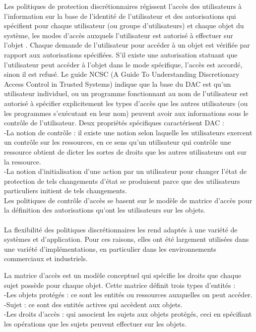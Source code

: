 \label{sectionDAC}

Les politiques de protection discrétionnaires régissent l'accès des utilisateurs à l'information sur la base de l'identité de l'utilisateur et des autorisations qui spécifient pour chaque utilisateur (ou groupe d'utilisateurs) et chaque objet du système, les modes d'accès auxquels l'utilisateur est autorisé à effectuer sur l'objet \cite{sandhu94}. Chaque demande de l'utilisateur pour accéder à un objet est vérifiée par rapport aux autorisations spécifiées. S'il existe une autorisation statuant que l'utilisateur peut accéder à l'objet dans le mode spécifique, l'accès est accordé, sinon il est refusé. Le guide NCSC (A Guide To Understanding Discretionary Access Control in Trusted Systems) indique que la base du DAC est qu'un utilisateur individuel, ou un programme fonctionnant au nom de l'utilisateur est autorisé à spécifier explicitement les types d'accès que les autres utilisateurs (ou les programmes s'exécutant en leur nom) peuvent avoir aux informations sous le contrôle de l'utilisateur. Deux propriétés spécifiques caractérisent DAC :\\ 
-La notion de contrôle : il existe une notion selon laquelle les utilisateurs exercent un contrôle sur les ressources, en ce sens qu'un utilisateur qui contrôle une ressource obtient de dicter les sortes de droits que les autres utilisateurs ont sur la ressource.\\
-La notion d'initialisation d'une action par un utilisateur pour changer l'état de protection de tels changements d'état se produisent parce que des utilisateurs particuliers initient de tels changements.\\
Les politiques de contrôle d'accès se basent sur le modèle de matrice d'accès pour la définition des autorisations qu'ont les utilisateurs sur les objets.
\paragraph{} La flexibilité des politiques discrétionnaires les rend adaptés à une variété de systèmes et d'application. Pour ces raisons, elles ont été largement utilisées dans une variété d'implémentations, en particulier dans les environnements commerciaux et industriels.

\label{sectionMatriceAccès}

La matrice d'accès est un modèle conceptuel qui spécifie les droits que chaque sujet possède pour chaque objet. Cette matrice définit trois types d'entités \cite{rjaibi04} :\\
-Les objets protégés : ce sont les entités ou ressources auxquelles on peut  accéder.\\
-Sujet : ce sont des entités actives qui accèdent aux objets.\\
-Les droits d'accès : qui associent les sujets aux objets protégés, ceci en spécifiant les opérations que les sujets peuvent effectuer sur les objets.
